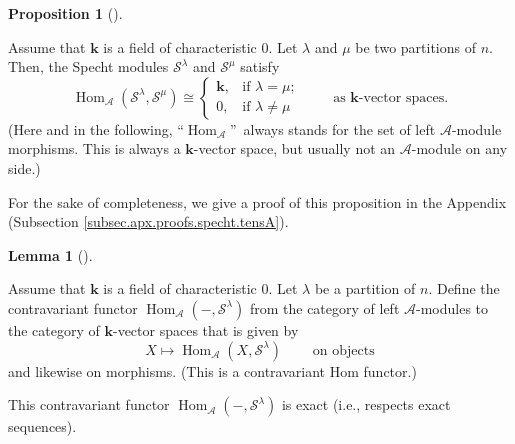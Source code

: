 \documentclass[numbers=enddot,12pt,final,onecolumn,notitlepage]{scrartcl}%
\theoremstyle{definition}
\newtheorem{lem}[theo]{Lemma}
\newenvironment{lemma}[1][]
{\begin{lem}[#1]\begin{leftbar}}
{\end{leftbar}\end{lem}}
\newtheorem{prop}[theo]{Proposition}
\newenvironment{proposition}[1][]
{\begin{prop}[#1]\begin{leftbar}}
{\end{leftbar}\end{prop}}
\begin{document}
\begin{proposition}
\label{prop.specht.tensA}Assume that $\mathbf{k}$ is a field of characteristic
$0$. Let $\lambda$ and $\mu$ be two partitions of $n$. Then, the Specht
modules $\mathcal{S}^{\lambda}$ and $\mathcal{S}^{\mu}$ satisfy%
\[
\operatorname*{Hom}\nolimits_{\mathcal{A}}\left(  \mathcal{S}^{\lambda
},\mathcal{S}^{\mu}\right)  \cong%
\begin{cases}
\mathbf{k}, & \text{if }\lambda=\mu;\\
0, & \text{if }\lambda\neq\mu
\end{cases}
\ \ \ \ \ \ \ \ \ \ \text{as }\mathbf{k}\text{-vector spaces.}%
\]
(Here and in the following, \textquotedblleft$\operatorname*{Hom}%
\nolimits_{\mathcal{A}}$\textquotedblright\ always stands for the set of left
$\mathcal{A}$-module morphisms. This is always a $\mathbf{k}$-vector space,
but usually not an $\mathcal{A}$-module on any side.)
\end{proposition}

For the sake of completeness, we give a proof of this proposition in the
Appendix (Subsection \ref{subsec.apx.proofs.specht.tensA}).

\begin{lemma}
\label{lem.specht.exact}Assume that $\mathbf{k}$ is a field of characteristic
$0$. Let $\lambda$ be a partition of $n$. Define the contravariant functor
$\operatorname*{Hom}\nolimits_{\mathcal{A}}\left(  -,\mathcal{S}^{\lambda
}\right)  $ from the category of left $\mathcal{A}$-modules to the category of
$\mathbf{k}$-vector spaces that is given by%
\[
X\mapsto\operatorname*{Hom}\nolimits_{\mathcal{A}}\left(  X,\mathcal{S}%
^{\lambda}\right)  \ \ \ \ \ \ \ \ \ \ \text{on objects}%
\]
and likewise on morphisms. (This is a contravariant Hom functor.)

This contravariant functor $\operatorname*{Hom}\nolimits_{\mathcal{A}}\left(
-,\mathcal{S}^{\lambda}\right)  $ is exact (i.e., respects exact sequences).
\end{lemma}
\end{document}
